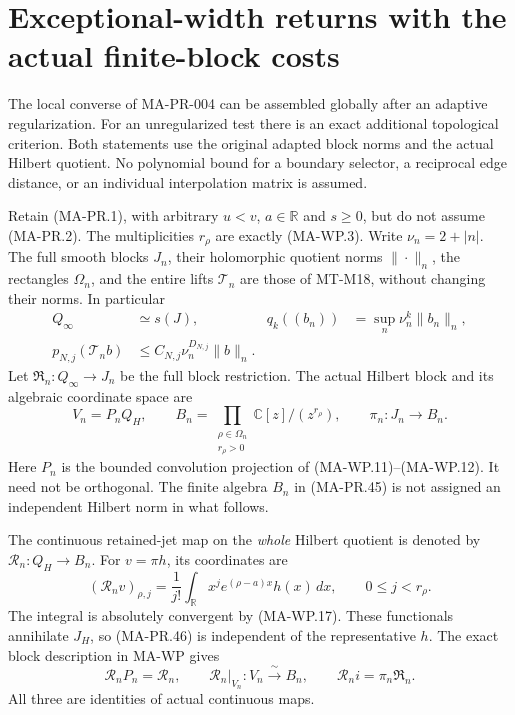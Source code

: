 \section{Exceptional-width returns with the actual finite-block costs}
\label{sec:exceptional-partial-return}

The local converse of MA-PR-004 can be assembled globally after
an adaptive regularization.  For an unregularized test there is
an exact additional topological criterion.  Both statements use
the original adapted block norms and the actual Hilbert quotient.
No polynomial bound for a boundary selector, a reciprocal edge
distance, or an individual interpolation matrix is assumed.

Retain (MA-PR.1), with arbitrary \(u<v\), \(a\in\mathbb R\)
and \(s\ge0\), but do not assume (MA-PR.2).
The multiplicities \(r_\rho\) are exactly (MA-WP.3).
Write \(\nu_n=2+|n|\).  The full smooth blocks \(J_n\),
their holomorphic quotient norms \(\|\cdot\|_n\), the rectangles
\(\Omega_n\), and the entire lifts \(\mathcal T_n\) are those
of MT-M18, without changing their norms.
In particular
\[
 \begin{aligned}
 Q_\infty&\simeq s(J),&
 q_k((b_n))&=\sup_n\nu_n^k\|b_n\|_n,\\
 p_{N,j}(\mathcal T_n b)&\le C_{N,j}\nu_n^{D_{N,j}}\|b\|_n .
 \end{aligned}
 \tag{MA-PR.44}
\]
Let \(\mathfrak R_n:Q_\infty\to J_n\) be the full block
restriction.  The actual Hilbert block and its algebraic
coordinate space are
\[
 V_n=P_nQ_H,\qquad
 B_n=\prod_{\substack{\rho\in\Omega_n\\r_\rho>0}}
                      \mathbb C[z]/(z^{r_\rho}),\qquad
 \pi_n:J_n\longrightarrow B_n .
 \tag{MA-PR.45}
\]
Here \(P_n\) is the bounded convolution projection of
(MA-WP.11)--(MA-WP.12).  It need not be orthogonal.
The finite algebra \(B_n\) in (MA-PR.45) is not assigned an
independent Hilbert norm in what follows.

The continuous retained-jet map on the \emph{whole} Hilbert
quotient is denoted by \(\mathscr R_n:Q_H\to B_n\).
For \(v=\pi h\), its coordinates are
\[
 (\mathscr R_nv)_{\rho,j}
    =\frac1{j!}\int_{\mathbb R}x^j e^{(\rho-a)x}h(x)\,dx,
       \qquad 0\le j<r_\rho .
 \tag{MA-PR.46}
\]
The integral is absolutely convergent by (MA-WP.17).
These functionals annihilate \(J_H\), so (MA-PR.46) is
independent of the representative \(h\).
The exact block description in MA-WP gives
\[
 \mathscr R_nP_n=\mathscr R_n,\qquad
 \mathscr R_n|_{V_n}:V_n\xrightarrow{\ \sim\ }B_n,\qquad
 \mathscr R_ni=\pi_n\mathfrak R_n .
 \tag{MA-PR.47}
\]
All three are identities of actual continuous maps.

